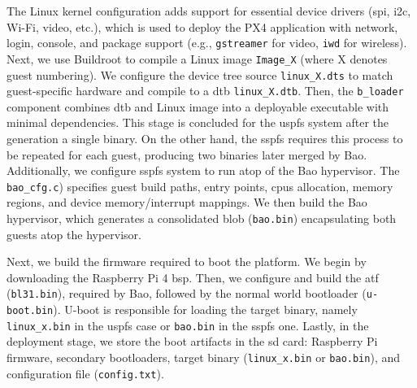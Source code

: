 The Linux kernel configuration adds support for essential device drivers
(\gls{spi}, \gls{i2c}, Wi-Fi, video, etc.), which is used to deploy the PX4
application with network, login, console, and package support (e.g.,
\lstinline{gstreamer} for video, \lstinline{iwd} for wireless). Next, we use
Buildroot to compile a Linux image
\lstinline{Image_X} (where X denotes guest numbering). We configure the device tree source
\lstinline{linux_X.dts} to match guest-specific hardware and compile to a
\gls{dtb} \lstinline{linux_X.dtb}. Then, the \lstinline{b_loader}
component combines \gls{dtb} and Linux image into a deployable executable with
minimal dependencies. This stage is concluded for the \gls{uspfs} system after
the generation a single binary. On the other hand, the \gls{sspfs} requires this
process to be repeated for each guest, producing two binaries later merged by
Bao. Additionally, we configure \gls{sspfs} system to run atop of the Bao
hypervisor. The \lstinline{bao_cfg.c}) specifies guest build paths, entry
points, \glspl{cpu} allocation, memory regions, and device memory/interrupt
mappings. We then build the Bao hypervisor, which generates a consolidated blob
(\lstinline{bao.bin}) encapsulating both guests atop the hypervisor.
 
Next, we build the firmware required to boot the platform. We begin by
downloading the Raspberry Pi 4 \gls{bsp}. Then, we configure and build the
\gls{atf} (\lstinline{bl31.bin}), required by Bao, followed by the normal world
bootloader (\lstinline{u-boot.bin}). U-boot is responsible for loading the
target binary, namely \lstinline{linux_x.bin} in the \gls{uspfs} case or
\lstinline{bao.bin} in the \gls{sspfs} one.
Lastly, in the deployment stage, we store the boot artifacts in the \gls{sd}
card: Raspberry Pi firmware, secondary bootloaders, target binary
(\lstinline{linux_x.bin} or \lstinline{bao.bin}), and configuration file
(\lstinline{config.txt}).

